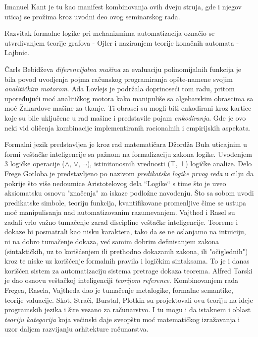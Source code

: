 \documentclass[fontsize=11bp, paper=a4]{scrartcl}
\begin{document}
Imanuel Kant je tu kao manifest kombinovanja ovih dveju struja, gde i njegov uticaj se prožima kroz uvodni deo ovog seminarskog rada.

Razvitak formalne logike pri mehanizmima automatizacija označio se utvrđivanjem teorije grafova - Ojler i naziranjem teorije konačnih automata - Lajbnic.

Čarls Bebidževa \textit{diferencijalna mašina} za evaluaciju polinomijalnih funkcija je bila povod uvodjenja pojma računskog programiranja opšte-namene svojim \textit{analitičkim motorom}. 
Ada Lovlejs je podržala doprinoseći tom radu, pritom upoređujući moć analitičkog motora kako manipuliše sa algebarskim obrascima sa moć Žakardove mašine za tkanje. 
Ti obrasci su mogli biti enkodirani kroz kartice koje su bile uključene u rad mašine i predstavile pojam \textit{enkodiranja}. Gde je ovo neki vid oličenja kombinacije implementiranih racionalnih i empirijskih aspekata.

Formalni jezik predstavljen je kroz rad matematičara Džordža Bula uticajnim u formi veštačke inteligencije sa pažnom na formalizaciju zakona logike. 
Uvođenjem 3 logičke operacije ($\land$, $\lor$, $\lnot$), istinitonosnih vrednosti ($\top$, $\bot$) logičke analize. 
Delo Frege Gotloba je predstavljeno po nazivom \textit{predikatske logike prvog reda} u cilju da pokrije što više nedoumice Aristotelovog dela ``Logike``  s time što je uveo aksiomatsku osnovu "značenja" za iskaze podložne navođenju.
Što sa sobom uvodi predikatske simbole, teoriju funkcija, kvantifikovane promenljive čime se ustupa moć manipulisanja nad automatizovanim razumevanjem.
Vajthed i Rasel su zadali vrlo važno tumačenje zarad discipline veštačke inteligencije. 
Teoreme i dokaze bi posmatrali kao nisku karaktera, tako da se ne oslanjamo na intuiciju, ni na dobro tumačenje dokaza, već samim dobrim definisanjem zakona (sintaktičkih, uz to korišćenjem ili prethodno dokazanih zakona, ili "očiglednih") kroz te niske uz korišćenje formalnih pravila i logičkim sintaksama. To je i danas korišćen sistem za automatizaciju sistema pretrage dokaza teorema.
Alfred Tarski je dao osnovu veštačkoj inteligenciji \textit{teorijom reference}. Kombinovanjem rada Fregea, Rasela, Vajtheda dao je tumačenje metalogike, formalne semantike, teorije valuacije. Skot, Strači, Burstal, Plotkin su projektovali ovu teoriju na ideje programskih jezika i šire vezano za računarstvo. I tu mogu i da istaknem i oblast \textit{teoriju kategorija}\cite{category_theory} koja većinski daje sveopštu moć matematičkog izražavanja i uzor daljem razvijanju arhitekture računarstva.
\end{document}
